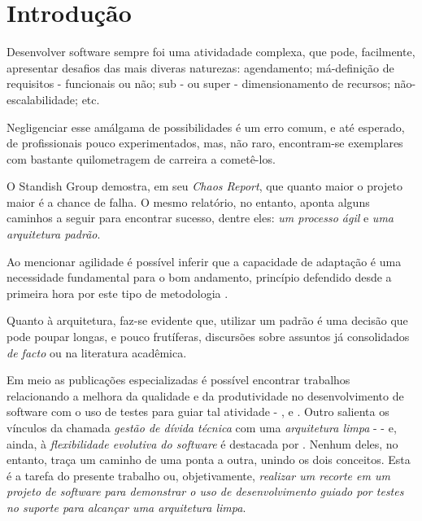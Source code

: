\section{Introdução}

  Desenvolver software sempre foi uma atividadade complexa, que pode, facilmente,  apresentar desafios das mais diveras naturezas: agendamento; má-definição de  requisitos - funcionais ou não; sub - ou super - dimensionamento de recursos; não-escalabilidade; etc.

  Negligenciar esse amálgama de possibilidades é um erro comum, e até esperado, de profissionais pouco experimentados, mas, não raro, encontram-se exemplares com bastante quilometragem de carreira a cometê-los.

  O Standish Group demostra, em seu \emph{Chaos Report}\cite{ChaosReport2015}, que quanto maior o projeto maior é a chance de falha. O mesmo relatório, no entanto, aponta alguns caminhos a seguir para encontrar sucesso, dentre eles: \emph{um processo ágil} e \emph{uma arquitetura padrão}.

  Ao mencionar agilidade é possível inferir que a capacidade de adaptação é uma  necessidade fundamental para o bom andamento, princípio defendido desde a  primeira hora por este tipo de metodologia \cite{ManifestoAgil2001}.

  Quanto à arquitetura, faz-se evidente que, utilizar um padrão é uma decisão que pode poupar longas, e pouco frutíferas, discursões sobre assuntos já consolidados \emph{de facto} ou na literatura acadêmica.

  Em meio as publicações especializadas é possível encontrar trabalhos relacionando a melhora da qualidade e da produtividade no desenvolvimento de software com o uso de testes para guiar tal atividade - \cite{Moggi2011}, \cite{Filho2012} e \cite{Benato2021}. Outro salienta os vínculos da chamada \emph{gestão de dívida técnica} com uma \emph{arquitetura limpa} - \cite{Beltrao2020} - e, ainda, à \emph{flexibilidade evolutiva do software} é destacada por \cite{Souza2021}. Nenhum deles, no entanto, traça um caminho de uma ponta a outra, unindo os dois conceitos. Esta é a tarefa do presente trabalho ou, objetivamente, \emph{realizar um recorte em um projeto de software para demonstrar o uso de desenvolvimento guiado por testes no suporte para alcançar uma arquitetura limpa}.
